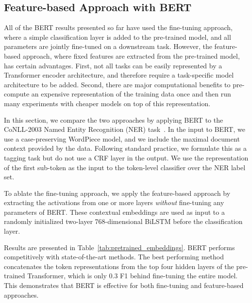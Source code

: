 \documentclass[11pt,a4paper]{article}
\newcommand\bertlarge{BERT\xspace}
\begin{document}
\subsection{Feature-based Approach with BERT}
\label{sec:ner}
All of the BERT results presented so far have used the fine-tuning approach, where a simple classification layer is added to the pre-trained model, and all parameters are jointly fine-tuned on a downstream task. However, the feature-based approach, where fixed features are extracted from the pre-trained model, has certain advantages. First, not all
tasks can be easily represented by a Transformer encoder architecture, and therefore require a task-specific model architecture to be added. Second, there are major computational benefits to
pre-compute an expensive representation of the training data once and then run many experiments with 
cheaper
models on top of this representation. 

In this section, we compare the two approaches by applying BERT to the CoNLL-2003 Named Entity Recognition (NER) task~\cite{tjong-de:2003}. In the input to BERT, we use a case-preserving WordPiece model, and we include the maximal document context provided by the data. Following standard practice, we formulate this as a tagging task but do not use a CRF layer in the output. We use the representation of the first sub-token as the input to the token-level classifier over the NER label set.


To ablate the fine-tuning approach, we apply the feature-based approach by extracting the activations from one or more layers {\it without} fine-tuning any parameters of BERT. These contextual embeddings are used as input to a randomly initialized two-layer 768-dimensional BiLSTM before the classification layer.

Results are presented in Table~\ref{tab:pretrained_embeddings}. \bertlarge performs competitively with state-of-the-art methods. The best performing method concatenates the token representations from the top four hidden layers of the pre-trained Transformer, which is only 0.3 F1 behind fine-tuning the entire model. This demonstrates that BERT is effective for both fine-tuning and feature-based approaches.
\end{document}
